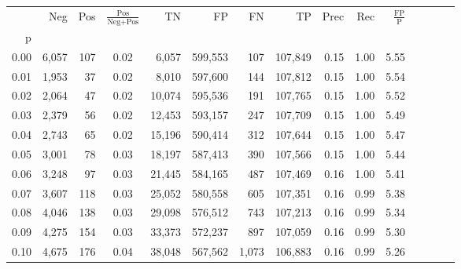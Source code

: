 \begin{tabular}{rrrcrrrrrrrrrrr}
\toprule
{} &     Neg &    Pos & $\frac{\text{Pos}}{\text{Neg}+\text{Pos}}$ &       TN &       FP &       FN &       TP &  Prec &   Rec & $\frac{\text{FP}}{\text{P}}$ \\
p    &         &        &                                            &          &          &          &          &       &       &                              \\
\midrule
0.00 &   6,057 &    107 &                                       0.02 &    6,057 &  599,553 &      107 &  107,849 &  0.15 &  1.00 &                         5.55 \\
0.01 &   1,953 &     37 &                                       0.02 &    8,010 &  597,600 &      144 &  107,812 &  0.15 &  1.00 &                         5.54 \\
0.02 &   2,064 &     47 &                                       0.02 &   10,074 &  595,536 &      191 &  107,765 &  0.15 &  1.00 &                         5.52 \\
0.03 &   2,379 &     56 &                                       0.02 &   12,453 &  593,157 &      247 &  107,709 &  0.15 &  1.00 &                         5.49 \\
0.04 &   2,743 &     65 &                                       0.02 &   15,196 &  590,414 &      312 &  107,644 &  0.15 &  1.00 &                         5.47 \\
0.05 &   3,001 &     78 &                                       0.03 &   18,197 &  587,413 &      390 &  107,566 &  0.15 &  1.00 &                         5.44 \\
0.06 &   3,248 &     97 &                                       0.03 &   21,445 &  584,165 &      487 &  107,469 &  0.16 &  1.00 &                         5.41 \\
0.07 &   3,607 &    118 &                                       0.03 &   25,052 &  580,558 &      605 &  107,351 &  0.16 &  0.99 &                         5.38 \\
0.08 &   4,046 &    138 &                                       0.03 &   29,098 &  576,512 &      743 &  107,213 &  0.16 &  0.99 &                         5.34 \\
0.09 &   4,275 &    154 &                                       0.03 &   33,373 &  572,237 &      897 &  107,059 &  0.16 &  0.99 &                         5.30 \\
0.10 &   4,675 &    176 &                                       0.04 &   38,048 &  567,562 &    1,073 &  106,883 &  0.16 &  0.99 &                         5.26 \\

\end{tabular}
